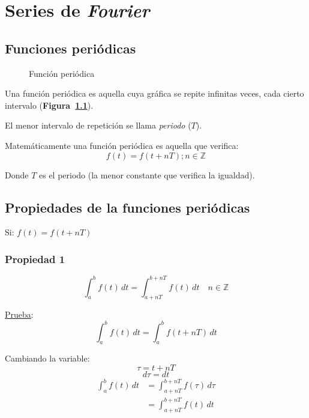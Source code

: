 \chapter{Series de \emph{Fourier}}

\section{Funciones periódicas}
\begin{figure}[H]
    \centering
    
    \caption{Función periódica}\label{figura_01}
\end{figure}

Una función periódica es aquella cuya gráfica se repite infinitas veces, cada
cierto intervalo (\textbf{Figura~\ref{figura_01}}).

El menor intervalo de repetición se llama \emph{periodo} ($T$).

Matemáticamente una función periódica es aquella que verifica:
\begin{equation}
    f(t)=f(t+nT);n\in\mathbb{Z}
\label{funcion_periodica}
\end{equation}

Donde $T$ es el periodo (la menor constante que verifica la igualdad).

\section{Propiedades de la funciones periódicas}
Si: $f(t)=f(t+nT)$
\subsection*{Propiedad 1}
\begin{equation}
    \int_a^b f(t)\,dt=\int_{a+nT}^{b+nT}f(t)\,dt\quad n\in\mathbb{Z}
\label{propiedad1}
\end{equation}

\underline{Prueba}:
\begin{equation*}
    \int_a^b f(t)\,dt=\int_{a}^{b} f(t+nT)\,dt
\end{equation*}

Cambiando la variable:
\begin{equation*}
    \tau=t+nT
\end{equation*}
\begin{equation*}
    d\tau=dt
\end{equation*}
\begin{equation*}
\begin{split}
    \int_a^b f(t)\,dt
        &=\int_{a+nT}^{b+nT} f(\tau)\,d\tau\\
        &=\int_{a+nT}^{b+nT} f(t)\,dt
\end{split}
\end{equation*}

